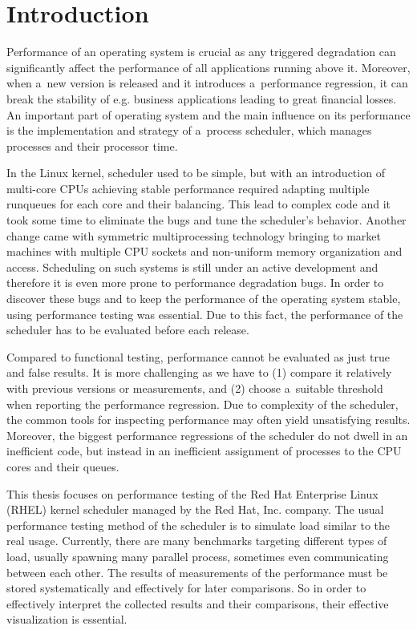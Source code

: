 \chapter{Introduction}
Performance of an operating system is crucial as any triggered degradation can
significantly affect the performance of all applications running above it.
Moreover, when a~new version is released and it introduces a~performance
regression, it can break the stability of e.g. business applications leading to
great financial losses. An important part of operating system and the main
influence on its performance is the implementation and strategy of a~process
scheduler, which manages processes and their processor time.

In the Linux kernel, scheduler used to be simple, but with an introduction of
multi-core CPUs achieving stable performance required adapting
multiple runqueues for each core and
their balancing. This lead to complex code and it took some time
to eliminate the bugs and tune the scheduler's behavior. Another change came with
symmetric multiprocessing technology bringing to market machines with multiple
CPU sockets and non-uniform memory organization and access\;\cite{wasted-cores}.
Scheduling on such systems is still under an active development and therefore
it is even more prone to performance degradation bugs. In order to discover these bugs and
to keep the performance of the operating system stable, using performance testing was essential.
Due to this fact, the performance of the scheduler has to be evaluated
before each release.

Compared to functional testing, performance cannot be evaluated as just true and
false results. It is more challenging as we have to (1) compare it relatively with
previous versions or measurements, and (2) choose a~suitable threshold when reporting
the performance regression. Due to complexity of the scheduler, the common tools
for inspecting performance may often yield unsatisfying results.
Moreover, the biggest performance regressions of the scheduler do not dwell in an
inefficient code, but instead in an inefficient assignment of processes to the
CPU cores and their queues.

This thesis focuses on performance testing of the Red Hat Enterprise Linux
(RHEL) kernel scheduler managed by the Red Hat, Inc. company.
The usual performance testing method of the scheduler is to simulate load
similar to the real usage. Currently, there are many benchmarks targeting different
types of load, usually spawning many parallel process, sometimes even
communicating between each other. The results of measurements of the performance
must be stored systematically and effectively for later
comparisons. So in order to effectively interpret the collected
results and their comparisons, their effective visualization is essential.

